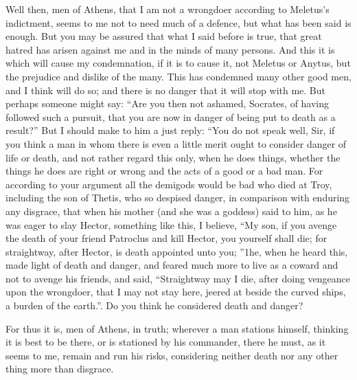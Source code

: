 Well then, men of Athens, that I am not a wrongdoer according to Meletus's indictment, seems to me not to need much of a defence, but what has been said is enough. But you may be assured that what I said before is true, that great hatred has arisen against me and in the minds of many persons. And this it is which will cause my condemnation, if it is to cause it, not Meletus or Anytus, but the prejudice and dislike of the many. This has condemned many other good men, and I think will do so;  and there is no danger that it will stop with me. But perhaps someone might say: “Are you then not ashamed, Socrates, of having followed such a pursuit, that you are now in danger of being put to death as a result?” But I should make to him a just reply: “You do not speak well, Sir, if you think a man in whom there is even a little merit ought to consider danger of life or death, and not rather regard this only, when he does things, whether the things he does are right or wrong and the acts of a good or a bad man. For according to your argument all the demigods  would be bad who died at Troy, including the son of Thetis, who so despised danger, in comparison with enduring any disgrace, that when his mother (and she was a goddess) said to him, as he was eager to slay Hector, something like this, I believe, “My son, if you avenge the death of your friend Patroclus and kill Hector, you yourself shall die;
for straightway, after Hector, is death appointed unto you;
”1he, when he heard this, made light of death and danger,  and feared much more to live as a coward and not to avenge his friends, and said, “Straightway may I die, after doing vengeance upon the wrongdoer, that I may not stay here, jeered at beside the curved ships, a burden of the earth.”. Do you think he considered death and danger?

For thus it is, men of Athens, in truth; wherever a man stations himself, thinking it is best to be there, or is stationed by his commander, there he must, as it seems to me, remain and run his risks, considering neither death nor any other thing more than disgrace.

